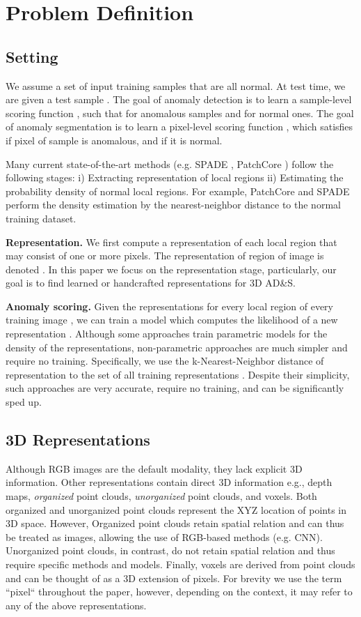 \documentclass{article}
\begin{document}
\section{Problem Definition}
\subsection{Setting}
We assume a set of input training samples  that are all normal. At test time, we are given a test sample . The goal of anomaly detection is to learn a sample-level scoring function , such that  for anomalous samples and  for normal ones. The goal of anomaly segmentation is to learn a pixel-level scoring function , which satisfies  if pixel  of sample  is anomalous, and  if it is normal.

Many current state-of-the-art methods (e.g. SPADE \cite{spade}, PatchCore \cite{patchcore}) follow the following stages: i) Extracting representation of local regions ii) Estimating the probability density of normal local regions. For example, PatchCore and SPADE perform the density estimation by the nearest-neighbor distance to the normal training dataset. 

\textbf{Representation.} We first compute a representation of each local region that may consist of one or more pixels. The representation of region  of image  is denoted . In this paper we focus on the representation stage, particularly, our goal is to find learned or handcrafted representations for 3D AD\&S.

\textbf{Anomaly scoring.} Given the representations for every local region  of every training image , we can train a model  which computes the likelihood of a new representation . Although some approaches train parametric models for the density of the representations, non-parametric approaches are much simpler and require no training. Specifically, we use the k-Nearest-Neighbor distance of representation  to the set of all training representations . Despite their simplicity, such approaches are very accurate, require no training, and can be significantly sped up.

\subsection{3D Representations}
Although RGB images are the default modality, they lack explicit 3D information. Other representations contain direct 3D information e.g., depth maps, \textit{organized} point clouds, \textit{unorganized} point clouds, and voxels. Both organized and unorganized point clouds represent the XYZ location of points in 3D space. However, Organized point clouds retain spatial relation and can thus be treated as images, allowing the use of RGB-based methods (e.g. CNN). Unorganized point clouds, in contrast, do not retain spatial relation and thus require specific methods and models. Finally, voxels are derived from point clouds and can be thought of as a 3D extension of pixels. For brevity we use the term ``pixel`` throughout the paper, however, depending on the context, it may refer to any of the above representations.
\end{document}
